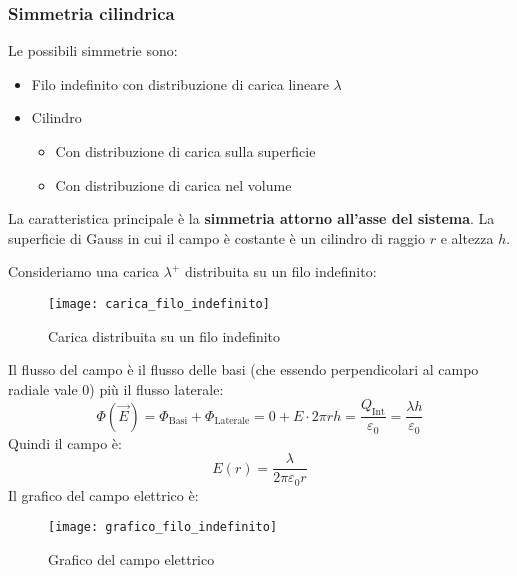 \documentclass[a4paper]{article}
\begin{document}
\subsubsection{Simmetria cilindrica}
Le possibili simmetrie sono:
\begin{itemize}
  \item Filo indefinito con distribuzione di carica lineare \( \lambda \)
  \item Cilindro
    \begin{itemize}
      \item Con distribuzione di carica sulla superficie
      \item Con distribuzione di carica nel volume
    \end{itemize}
\end{itemize}
La caratteristica principale è la \textbf{simmetria attorno all'asse del sistema}.
La superficie di Gauss in cui il campo è costante è un cilindro di raggio \( r \) e
altezza \( h \).
\begin{example}
  Consideriamo una carica \( \lambda^+ \) distribuita su un filo indefinito:
  \begin{figure}[H]
    \centering
    \texttt{[image: carica\_filo\_indefinito]}
    \caption{Carica distribuita su un filo indefinito}
  \end{figure}
  \noindent
  Il flusso del campo è il flusso delle basi (che essendo perpendicolari al campo radiale
  vale 0) più il flusso laterale:
  \[
    \Phi (\vec{E}) = \Phi_{\text{Basi}} + \Phi_{\text{Laterale}} = 0 + E \cdot 2 \pi r h =
    \frac{Q_{\text{Int}}}{\varepsilon_0} = \frac{\lambda h}{\varepsilon_0}
  \] 
  Quindi il campo è:
  \[
    E(r) = \frac{\lambda}{2 \pi \varepsilon_0 r}
  \] 
  Il grafico del campo elettrico è:
  \begin{figure}[H]
    \centering
    \texttt{[image: grafico\_filo\_indefinito]}
    \caption{Grafico del campo elettrico}
  \end{figure}
\end{example}
\end{document}
